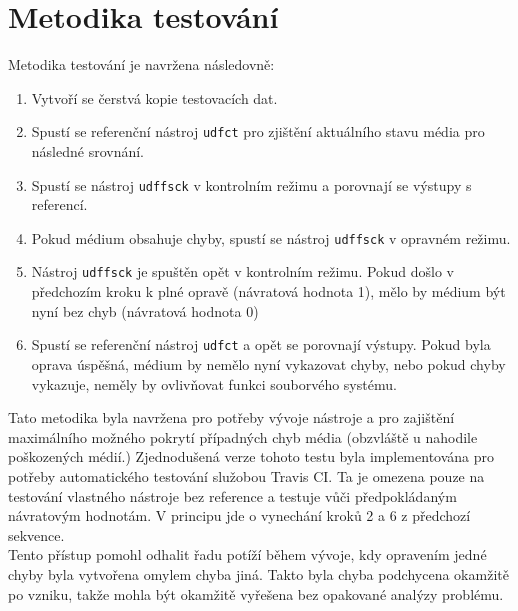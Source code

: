 \section{Metodika testování}
\label{sec:metodika}
Metodika testování je navržena následovně:
\begin{enumerate}
    \item Vytvoří se čerstvá kopie testovacích dat.
    \item Spustí se referenční nástroj \texttt{udfct} \cite{wayback} pro zjištění aktuálního stavu média pro následné srovnání.
    \item Spustí se nástroj \texttt{udffsck} v kontrolním režimu a porovnají se výstupy s referencí.
    \item Pokud médium obsahuje chyby, spustí se nástroj \texttt{udffsck} v opravném režimu.
    \item Nástroj \texttt{udffsck} je spuštěn opět v kontrolním režimu. Pokud došlo v předchozím kroku k plné opravě (návratová hodnota 1), mělo by médium být nyní bez chyb (návratová hodnota 0)
    \item Spustí se referenční nástroj \texttt{udfct} a opět se porovnají výstupy. Pokud byla oprava úspěšná, médium by nemělo nyní vykazovat chyby, nebo pokud chyby vykazuje, neměly by ovlivňovat funkci souborvého systému.
\end{enumerate}
Tato metodika byla navržena pro potřeby vývoje nástroje a pro zajištění maximálního možného pokrytí případných chyb média (obzvláště u nahodile poškozených médií.) Zjednodušená verze tohoto testu byla implementována pro potřeby automatického testování služobou Travis CI. Ta je omezena pouze na testování vlastného nástroje bez reference a testuje vůči předpokládaným návratovým hodnotám. V principu jde o vynechání kroků 2 a 6 z předchozí sekvence.\\
Tento přístup pomohl odhalit řadu potíží během vývoje, kdy opravením jedné chyby byla vytvořena omylem chyba jiná. Takto byla chyba podchycena okamžitě po vzniku, takže mohla být okamžitě vyřešena bez opakované analýzy problému. 

